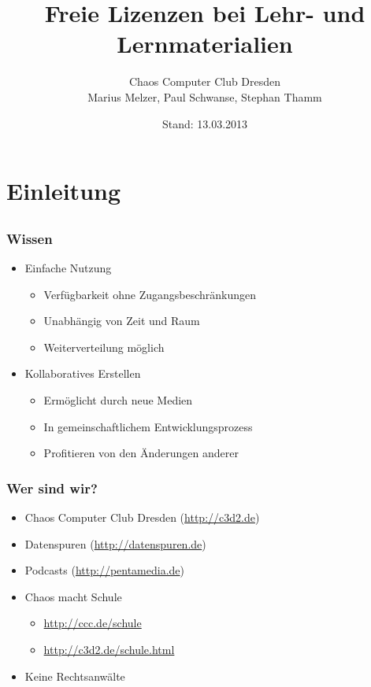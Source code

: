 \documentclass{beamer}
\title{Freie Lizenzen bei Lehr- und Lernmaterialien}
\author{Chaos Computer Club Dresden\\Marius Melzer, Paul Schwanse, Stephan Thamm}
\date{Stand: 13.03.2013}
\begin{document}
\maketitle

\frame{\tableofcontents[hideallsubsections]}

\section{Einleitung}
\subsection{}

\begin{frame}
    \frametitle{Wissen}
    \begin{itemize}
      \item Einfache Nutzung
      \begin{itemize}
        \item Verfügbarkeit ohne Zugangsbeschränkungen
        \item Unabhängig von Zeit und Raum
        \item Weiterverteilung möglich
      \end{itemize}
      \item Kollaboratives Erstellen
      \begin{itemize}
        \item Ermöglicht durch neue Medien
        \item In gemeinschaftlichem Entwicklungsprozess
        \item Profitieren von den Änderungen anderer
      \end{itemize}
    \end{itemize}
\end{frame}
 
\begin{frame}
    \frametitle{Wer sind wir?}
    \begin{itemize}
        \item<2-> Chaos Computer Club Dresden (\url{http://c3d2.de})
            \note{}
        \item<3-> Datenspuren (\url{http://datenspuren.de})
        \item<4-> Podcasts (\url{http://pentamedia.de})
        \item<5-> Chaos macht Schule
            \begin{itemize}
                \item<2-> \url{http://ccc.de/schule}
                \item<2-> \url{http://c3d2.de/schule.html}
            \end{itemize}
        \item<6-> Keine Rechtsanwälte
    \end{itemize}
\end{frame}
\end{document}
